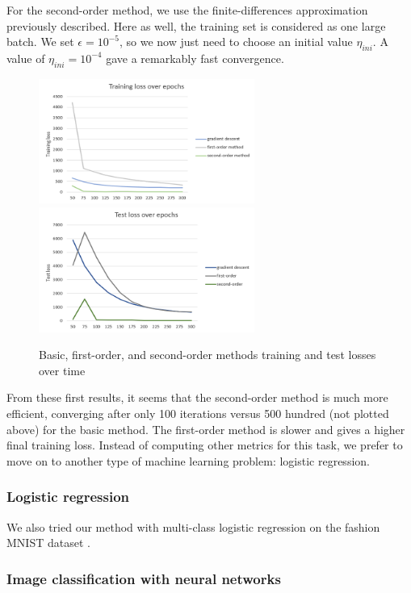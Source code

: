 \documentclass{article}
\begin{document}
  For the second-order method, we use the finite-differences approximation previously described. Here as well, the training set is considered as one large batch. We set $\epsilon=10^{-5}$, so we now just need to choose an initial value $\eta_{ini}$. A value of $\eta_{ini}=10^{-4}$ gave a remarkably fast convergence.

  \begin{figure}[!h]
	\includegraphics[width=200pt]{loss_train_linear.png}
	\includegraphics[width=200pt]{loss_test_linear.png}
	\caption{Basic, first-order, and second-order methods training and test losses over time}
  \end{figure}
  
  From these first results, it seems that the second-order method is much more efficient, converging after only 100 iterations versus 500 hundred (not plotted above) for the basic method. The first-order method is slower and gives a higher final training loss. Instead of computing other metrics for this task, we prefer to move on to another type of machine learning problem: logistic regression.
  
  
  \subsubsection{Logistic regression}
  
  We also tried our method with multi-class logistic regression on the fashion MNIST dataset \cite{xiao2017fashion}. 

  \subsubsection{Image classification with neural networks}
  
\end{document}
